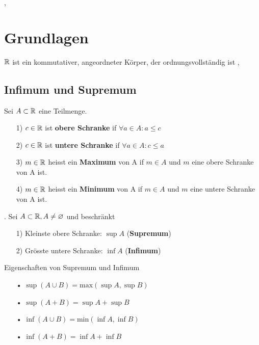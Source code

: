 \sep
\section{Grundlagen}
\Satz[1.1.2]  $\mathbb{R}$ ist ein kommutativer, angeordneter Körper, der ordnungsvollständig ist
\sep

\subsection{Infimum und Supremum}
\Def[1.1.12]  Sei $A \subset \mathbb{R}$ eine Teilmenge.
\begin{enumerate}
\item[1)]  $c \in \mathbb{R}$ ist \textbf{obere Schranke} if  $\forall a \in A: a \leqslant c$
\item[2)]  $c \in \mathbb{R}$ ist \textbf{untere Schranke} if $\forall a \in A: c \leqslant a$
\item[3)] $m \in \mathbb{R}$ heisst ein \textbf{Maximum} von A if $m \in A$ und $m$ eine obere Schranke von A ist.
\item[4)] $m \in \mathbb{R}$ heisst ein \textbf{Minimum} von A if $m \in A$ und $m$ eine untere Schranke von A ist.
\end{enumerate}

\Satz[1.1.15]. Sei $A \subset \mathbb{R}, A \neq \varnothing$ und beschränkt
\begin{enumerate}
\item[1)]  Kleinste obere Schranke: $\sup A$ (\textbf{Supremum})
\item[2)]  Grösste untere Schranke: $\inf A $ (\textbf{Infimum})
\end{enumerate}

Eigenschaften von Supremum und Infimum
\begin{enumerate}
\item[•]  $\sup (A \cup B) = \text{max} (\sup A, \sup B)$
\item[•]  $\sup (A + B) = \sup A + \sup B$
\item[•]  $\inf (A \cup B) = \text{min} (\inf A, \inf B)$
\item[•]  $\inf (A + B) = \inf A + \inf B$
\end{enumerate}
